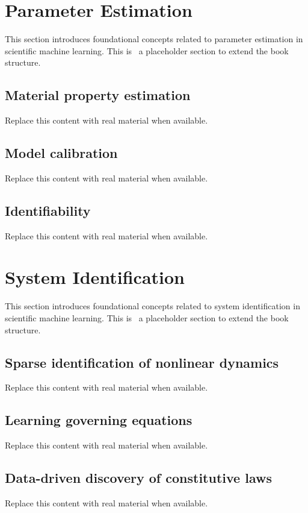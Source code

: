 
\section{Parameter Estimation}
This section introduces foundational concepts related to parameter estimation in scientific machine learning. This is~\cite{abdulmaksoudTransformerBasedSensorFusion2025} a placeholder section to extend the book structure.

\subsection{Material property estimation}
Replace this content with real material when available.

\subsection{Model calibration}
Replace this content with real material when available.

\subsection{Identifiability}
Replace this content with real material when available.

\section{System Identification}
This section introduces foundational concepts related to system identification in scientific machine learning. This is~\cite{abdulmaksoudTransformerBasedSensorFusion2025} a placeholder section to extend the book structure.

\subsection{Sparse identification of nonlinear dynamics}
Replace this content with real material when available.

\subsection{Learning governing equations}
Replace this content with real material when available.

\subsection{Data-driven discovery of constitutive laws}
Replace this content with real material when available.


